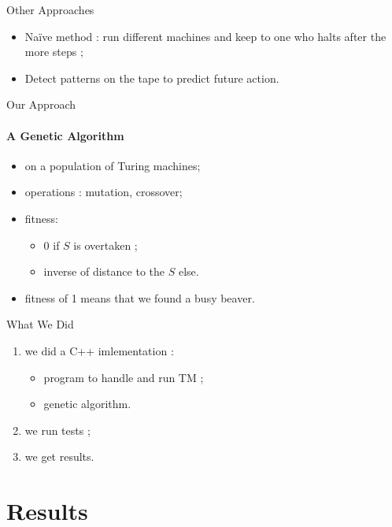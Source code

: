\documentclass{beamer}
\begin{document}
\begin{frame}{Other Approaches}

\begin{itemize}
\item Naïve method : run different machines and keep to one who halts after the more steps ; %
\item Detect patterns on the tape to predict future action.
\end{itemize}

\end{frame}

\begin{frame}{Our Approach}
\framesubtitle{A Genetic Algorithm}

\begin{itemize}
\item on a population of Turing machines;
\item operations : mutation, crossover;
\item fitness:
  \begin{itemize}
  \item 0 if $S$ is overtaken ;
  \item inverse of distance to the $S$ else.
  \end{itemize}
\item fitness of 1 means that we found a busy beaver.
\end{itemize}

\end{frame}

\begin{frame}{What We Did}

\begin{enumerate}
\item we did a C++ imlementation :
  \begin{itemize}
  \item program to handle and run TM ;
  \item genetic algorithm.
  \end{itemize}
\item we run tests ;
\item we get results.
\end{enumerate}
\end{frame}

\section{Results}
\end{document}
